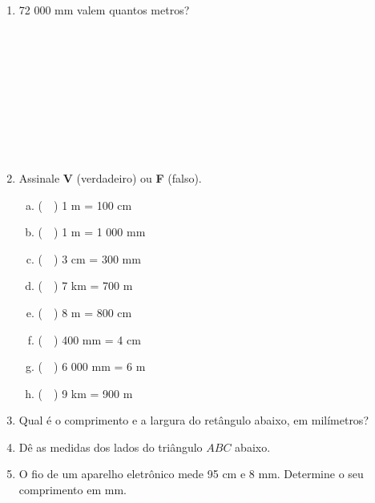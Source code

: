 \documentclass[a4paper,14pt]{article}
\begin{document}
\begin{multicols}{2}
\begin{enumerate}
			\item 72 000 mm valem quantos metros? \\\\\\\\\\\\\\\\\\\\
			\item Assinale \textbf{V} (verdadeiro) ou \textbf{F} (falso).
			\begin{enumerate}[a)]
				\item (~~) 1 m = 100 cm
				\item (~~) 1 m = 1 000 mm
				\item (~~) 3 cm = 300 mm
				\item (~~) 7 km = 700 m
				\item (~~) 8 m = 800 cm
				\item (~~) 400 mm = 4 cm
				\item (~~) 6 000 mm = 6 m
				\item (~~) 9 km = 900 m \newpage
			\end{enumerate}
			\item Qual é o comprimento e a largura do retângulo abaixo, em milímetros?
			\begin{center}
			\end{center}
			\item Dê as medidas dos lados do triângulo $ABC$ abaixo.
			\begin{center}
			\end{center}
			\columnbreak\item O fio de um aparelho eletrônico mede 95 cm e 8 mm. Determine o seu comprimento em mm. \\\\\\\\\\\\\\\\\\\\

\end{enumerate}
\end{multicols}
\end{document}
